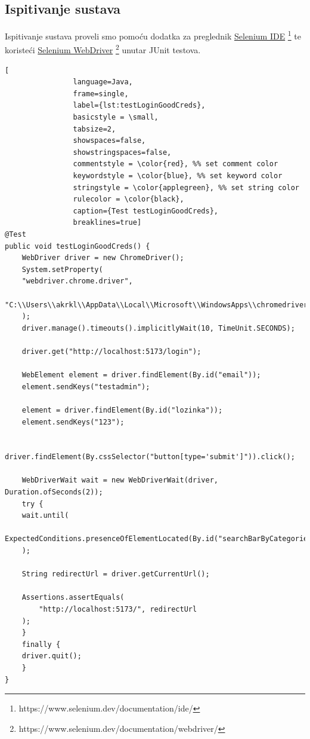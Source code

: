 \pagebreak

\subsection{Ispitivanje sustava}

Ispitivanje sustava proveli smo pomoću dodatka za preglednik
\underline{Selenium IDE} \footnote{https://www.selenium.dev/documentation/ide/}
te koristeći \underline{Selenium WebDriver}
\footnote{https://www.selenium.dev/documentation/webdriver/} unutar JUnit
testova.

\renewcommand{\lstlistingname}{Kod}
\begin{lstlisting}[
				language=Java,
				frame=single,
				label={lst:testLoginGoodCreds},
				basicstyle = \small,
				tabsize=2,
				showspaces=false,
				showstringspaces=false,
				commentstyle = \color{red}, %% set comment color
				keywordstyle = \color{blue}, %% set keyword color
				stringstyle = \color{applegreen}, %% set string color
				rulecolor = \color{black},
				caption={Test testLoginGoodCreds},
				breaklines=true]
@Test
public void testLoginGoodCreds() {
	WebDriver driver = new ChromeDriver();
	System.setProperty(
	"webdriver.chrome.driver", 
	"C:\\Users\\akrkl\\AppData\\Local\\Microsoft\\WindowsApps\\chromedriver.exe"
	);
	driver.manage().timeouts().implicitlyWait(10, TimeUnit.SECONDS);

	driver.get("http://localhost:5173/login");

	WebElement element = driver.findElement(By.id("email"));
	element.sendKeys("testadmin");

	element = driver.findElement(By.id("lozinka"));
	element.sendKeys("123");

	driver.findElement(By.cssSelector("button[type='submit']")).click();

	WebDriverWait wait = new WebDriverWait(driver, Duration.ofSeconds(2));
	try {
	wait.until(
		ExpectedConditions.presenceOfElementLocated(By.id("searchBarByCategories"))
	);

	String redirectUrl = driver.getCurrentUrl();

	Assertions.assertEquals(
		"http://localhost:5173/", redirectUrl
	);
	}
	finally {
	driver.quit();
	}
}	
			\end{lstlisting}

